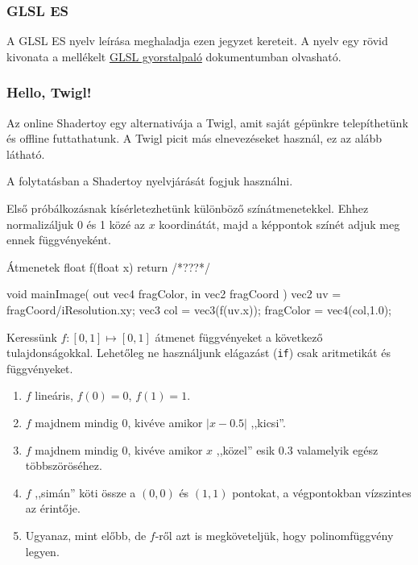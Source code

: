 \subsubsection{GLSL ES}

A GLSL ES nyelv leírása meghaladja ezen jegyzet kereteit.
A nyelv egy rövid kivonata a mellékelt \href{run:./glsl.pdf}{GLSL gyorstalpaló}
dokumentumban olvasható.



\subsubsection{Hello, Twigl!}

Az online Shadertoy egy alternativája a Twigl, amit saját gépünkre telepíthetünk és offline futtathatunk.
A Twigl picit más elnevezéseket használ, ez az alább látható.

  
A folytatásban a Shadertoy nyelvjárását fogjuk használni. 

\matfeladatok

Első próbálkozásnak kísérletezhetünk különböző színátmenetekkel. Ehhez normalizáljuk 0 és 1 közé
az $x$ koordinátát, majd a képpontok színét adjuk meg ennek függvényeként.

\begin{glsl}{Átmenetek}
float f(float x) { return /*???*/ }
    
void mainImage( out vec4 fragColor, in vec2 fragCoord )
{
  vec2 uv = fragCoord/iResolution.xy;
  vec3 col = vec3(f(uv.x));
  fragColor = vec4(col,1.0);
}
\end{glsl}

Keressünk $f: [0, 1] \mapsto [0,1]$ átmenet függvényeket a következő tulajdonságokkal.
Lehetőleg ne használjunk elágazást (\texttt{if}) csak aritmetikát és függvényeket.

\begin{enumerate}[resume]
  \item $f$ lineáris, $f(0)=0$, $f(1)=1$.
  \item $f$ majdnem mindig 0, kivéve amikor $|x-0.5|$ ,,kicsi''.
  \item $f$ majdnem mindig 0, kivéve amikor $x$ ,,közel'' esik $0.3$ valamelyik egész többszöröséhez.
  \item $f$ ,,simán'' köti össze a $(0,0)$ és $(1,1)$ pontokat, a végpontokban vízszintes az érintője.
  \item Ugyanaz, mint előbb, de $f$-ről azt is megköveteljük, hogy polinomfüggvény legyen. 
\end{enumerate}

